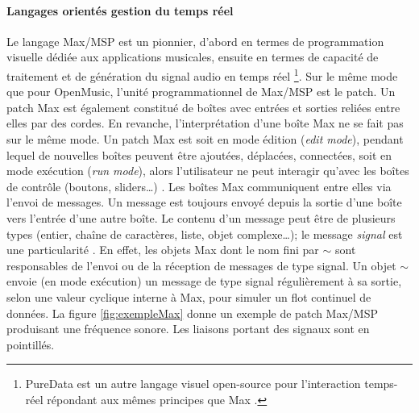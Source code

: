 \paragraph{Langages orientés gestion du temps réel} Le langage Max/MSP est un pionnier, d'abord en termes de programmation visuelle dédiée aux applications musicales, ensuite en termes de capacité de traitement et de génération du signal audio en temps réel \cite{favreau1986}\footnote{PureData est un autre langage visuel open-source pour l'interaction temps-réel répondant aux mêmes principes que Max \cite{puckette1996}.}.
Sur le même mode que pour OpenMusic, l'unité programmationnel de Max/MSP est le patch. Un patch Max est également constitué de boîtes avec entrées et sorties reliées entre elles par des cordes. En revanche, l'interprétation d'une boîte Max ne se fait pas sur le même mode. Un patch Max est soit en mode édition (\textit{edit mode}), pendant lequel de nouvelles boîtes peuvent être ajoutées, déplacées, connectées, soit en mode exécution (\textit{run mode}), alors l'utilisateur ne peut interagir qu'avec les boîtes de contrôle (boutons, sliders…) \cite{puckette1991}. Les boîtes Max communiquent entre elles via l'envoi de messages. Un message est toujours envoyé depuis la sortie d'une boîte vers l'entrée d'une autre boîte. Le contenu d'un message peut être de plusieurs types (entier, chaîne de caractères, liste, objet complexe…); le message \textit{signal} est une particularité \cite{max2018}. En effet, les objets Max dont le nom fini par $\sim$ sont responsables de l'envoi ou de la réception de messages de type signal. Un objet $\sim$ envoie (en mode exécution) un message de type signal régulièrement à sa sortie, selon une valeur cyclique interne à Max, pour simuler un flot continuel de données. La figure \ref{fig:exempleMax} donne un exemple de patch Max/MSP produisant une fréquence sonore. Les liaisons portant des signaux sont en pointillés.


